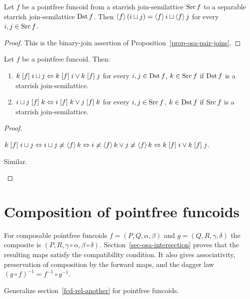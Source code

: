 \begin{thm}
\label{pf-dist-func}Let $f$ be a pointfree funcoid from a starrish
join-semilattice $\operatorname{Src} f$ to a separable starrish join-semilattice
$\operatorname{Dst} f$. Then $\left\langle f\right\rangle(i\sqcup j)=\left\langle f\right\rangle i\sqcup\left\langle f\right\rangle j$
for every $i,j\in\operatorname{Src} f$.\end{thm}
\begin{proof}
This is the binary-join assertion of Proposition~\ref{prop-osa-pair-joins}.
\end{proof}

\begin{prop}
\label{pf-join-arg}Let $f$ be a pointfree funcoid. Then:\end{prop}
\begin{enumerate}
\item \label{pf-f-join-y}$k\mathrel{\left[f\right]}i\sqcup j\Leftrightarrow k\mathrel{\left[f\right]}i\lor k\mathrel{\left[f\right]}j$
for every $i,j\in\operatorname{Dst} f$, $k\in\operatorname{Src} f$ if $\operatorname{Dst} f$ is a starrish
join-semilattice.
\item \label{pf-f-join-x}$i\sqcup j\mathrel{\left[f\right]}k\Leftrightarrow i\mathrel{\left[f\right]}k\lor j\mathrel{\left[f\right]}k$
for every $i,j\in\operatorname{Src} f$, $k\in\operatorname{Dst} f$ if $\operatorname{Src} f$ is a starrish
join-semilattice.\end{enumerate}
\begin{proof}
~
\begin{widedisorder}
\item [{\ref{pf-f-join-y}}] $k\mathrel{\left[f\right]}i\sqcup j\Leftrightarrow i\sqcup j\not\asymp\left\langle f\right\rangle k\Leftrightarrow i\not\asymp\left\langle f\right\rangle k\lor j\not\asymp\left\langle f\right\rangle k\Leftrightarrow k\mathrel{\left[f\right]}i\lor k\mathrel{\left[f\right]}j$.
\item [{\ref{pf-f-join-x}}] Similar.
\end{widedisorder}
\end{proof}

\section{Composition of pointfree funcoids}

For composable pointfree funcoids $f=(P,Q,\alpha,\beta)$ and
$g=(Q,R,\gamma,\delta)$ the composite is
$(P,R,\gamma\circ\alpha,\beta\circ\delta)$. Section~\ref{sec-osa-intersection}
proves that the resulting maps satisfy the compatibility condition.
It also gives associativity, preservation of composition by the
forward maps, and the dagger law $(g\circ f)^{-1}=f^{-1}\circ g^{-1}$.

\begin{xca}
Generalize section~\ref{fcd-rel-another} for pointfree funcoids.
\end{xca}

